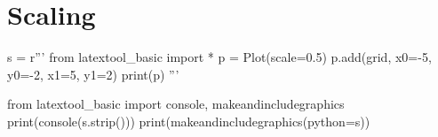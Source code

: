 \section{Scaling}

\begin{python}
s = r'''
from latextool_basic import *
p = Plot(scale=0.5)
p.add(grid, x0=-5, y0=-2, x1=5, y1=2)
print(p)
'''

from latextool_basic import console, makeandincludegraphics
print(console(s.strip()))
print(makeandincludegraphics(python=s))
\end{python}

